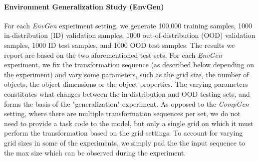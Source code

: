 \begin{itemize}
       

\paragraph{Environment Generalization Study (EnvGen)}
For each \textit{EnvGen} experiment setting, we generate 100,000 training samples, 1000 in-distribution (ID) validation samples, 1000 out-of-distribution (OOD) validation samples, 1000 ID test samples, and 1000 OOD test samples. The results we report are based on the two aforementioned test sets. For each \textit{EnvGen} experiment, we fix the transformation sequence (as described below depending on the experiment) and vary some parameters, such as the grid size, the number of objects, the object dimensions or the object properties. The varying parameters constitutes what changes between the in-distribution and OOD testing sets, and forms the basis of the "generalization" experiment. As opposed to the \textit{CompGen} setting, where there are multiple transformation sequences per set, we do not need to provide a task code to the model, but only a single grid on which it must perform the transformation based on the grid settings. To account for varying grid sizes in some of the experiments, we simply pad the the input sequence to the max size which can be observed during the experiment. 


\end{itemize}
